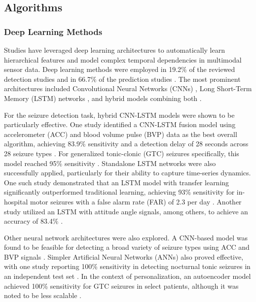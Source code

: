 \subsection{Algorithms}



\subsubsection{Deep Learning Methods}
Studies have leveraged deep learning architectures to automatically learn hierarchical features and model complex temporal dependencies in multimodal sensor data. Deep learning methods were employed in 19.2\% of the reviewed detection studies \cite{Yu2023-ss, Nasseri2021-xn, Larsen2024-vn, Wang2025-ql, Tang2021-td} and in 66.7\% of the prediction studies \cite{Vieluf2023-ta, Meisel2020-ii}. The most prominent architectures included Convolutional Neural Networks (CNNs) \cite{Yu2023-ss, Tang2021-td}, Long Short-Term Memory (LSTM) networks \cite{Meisel2020-ii, Yu2023-ss, Wang2025-ql}, and hybrid models combining both \cite{Yu2023-ss}.

For the seizure detection task, hybrid CNN-LSTM models were shown to be particularly effective. One study identified a CNN-LSTM fusion model using accelerometer (ACC) and blood volume pulse (BVP) data as the best overall algorithm, achieving 83.9\% sensitivity and a detection delay of 28 seconds across 28 seizure types \cite{Yu2023-ss}. For generalized tonic-clonic (GTC) seizures specifically, this model reached 95\% sensitivity \cite{Yu2023-ss}. Standalone LSTM networks were also successfully applied, particularly for their ability to capture time-series dynamics. One such study demonstrated that an LSTM model with transfer learning significantly outperformed traditional learning, achieving 93\% sensitivity for in-hospital motor seizures with a false alarm rate (FAR) of 2.3 per day \cite{Nasseri2021-xn}. Another study utilized an LSTM with attitude angle signals, among others, to achieve an accuracy of 83.4\% \cite{Wang2025-ql}.

Other neural network architectures were also explored. A CNN-based model was found to be feasible for detecting a broad variety of seizure types using ACC and BVP signals \cite{Tang2021-td}. Simpler Artificial Neural Networks (ANNs) also proved effective, with one study reporting 100\% sensitivity in detecting nocturnal tonic seizures in an independent test set \cite{Larsen2024-vn}. In the context of personalization, an autoencoder model achieved 100\% sensitivity for GTC seizures in select patients, although it was noted to be less scalable \cite{Yu2023-ss}.

